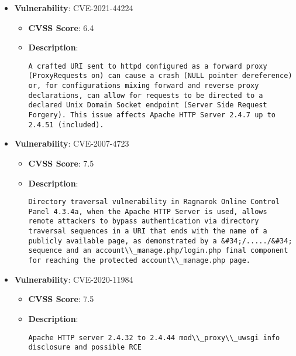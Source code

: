 \documentclass{article}
\begin{document}
\begin{itemize}
        \item \textbf{Vulnerability}: CVE-2021-44224
        \begin{itemize}
            \item \textbf{CVSS Score}:  6.4 
            \item \textbf{Description}:
            \parbox[t]{0.9\linewidth}{
                \verb|A crafted URI sent to httpd configured as a forward proxy (ProxyRequests on) can cause a crash (NULL pointer dereference) or, for configurations mixing forward and reverse proxy declarations, can allow for requests to be directed to a declared Unix Domain Socket endpoint (Server Side Request Forgery). This issue affects Apache HTTP Server 2.4.7 up to 2.4.51 (included).|
            }
        \end{itemize}
    
        \item \textbf{Vulnerability}: CVE-2007-4723
        \begin{itemize}
            \item \textbf{CVSS Score}:  7.5 
            \item \textbf{Description}:
            \parbox[t]{0.9\linewidth}{
                \verb|Directory traversal vulnerability in Ragnarok Online Control Panel 4.3.4a, when the Apache HTTP Server is used, allows remote attackers to bypass authentication via directory traversal sequences in a URI that ends with the name of a publicly available page, as demonstrated by a &#34;/...../&#34; sequence and an account\\_manage.php/login.php final component for reaching the protected account\\_manage.php page.|
            }
        \end{itemize}
    
        \item \textbf{Vulnerability}: CVE-2020-11984
        \begin{itemize}
            \item \textbf{CVSS Score}:  7.5 
            \item \textbf{Description}:
            \parbox[t]{0.9\linewidth}{
                \verb|Apache HTTP server 2.4.32 to 2.4.44 mod\\_proxy\\_uwsgi info disclosure and possible RCE|
            }
        \end{itemize}
    

\end{itemize}
\end{document}
